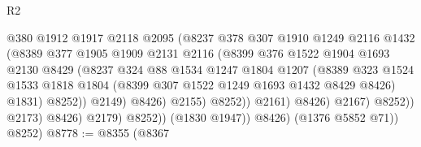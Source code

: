 \begin{lexlean}{R2}
\begin{coremodule}
                                      @380
                                      @1912
                                      @1917
                                      @2118
                                      @2095
                                      (@8237
                                        @378
                                        @307
                                        @1910
                                        @1249
                                        @2116
                                        @1432
                                        (@8389
                                          @377
                                          @1905
                                          @1909
                                          @2131
                                          @2116
                                          (@8399
                                            @376
                                            @1522
                                            @1904
                                            @1693
                                            @2130
                                            @8429
                                            (@8237
                                              @324
                                              @88
                                              @1534
                                              @1247
                                              @1804
                                              @1207
                                              (@8389
                                                @323
                                                @1524
                                                @1533
                                                @1818
                                                @1804
                                                (@8399 @307 @1522 @1249 @1693 @1432 @8429 @8426)
                                                @1831)
                                              @8252))
                                          @2149)
                                        @8426)
                                      @2155)
                                    @8252))
                                @2161)
                              @8426)
                            @2167)
                          @8252))
                      @2173)
                    @8426)
                  @2179)
                @8252))
            (@1830 @1947))
          @8426)
        (@1376 @5852 @71))
      @8252)
@8778 := @8355
    (@8367

\end{coremodule}
\end{lexlean}
